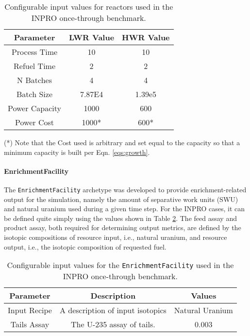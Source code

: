 \begin{table}[h]
\centering
\begin{threeparttable}
\begin{tabular}{ccc}
Parameter      & LWR Value & HWR Value               \\ \hline
Process Time   & 10         & 10                       \\
Refuel Time    & 2          & 2                        \\
N Batches      & 4          & 4                        \\
Batch Size     & 7.87E4     & 1.39e5                   \\
Power Capacity & 1000       & 600                      \\
Power Cost     & 1000*      & 600* \\ \hline
\end{tabular}
\begin{tablenotes}
  \small
  \item (*) Note that the Cost used is arbitrary and set equal to the
  capacity so that a minimum capacity is built per Eqn. \ref{eqs:growth}.
\end{tablenotes}
\end{threeparttable}
\caption{Configurable input values for reactors used in the INPRO once-through benchmark.}
\label{tbl:inprorxtr}
\end{table}

\paragraph{EnrichmentFacility}

The \texttt{EnrichmentFacility} archetype was developed to provide
enrichment-related output for the simulation, namely the amount of separative
work units (SWU) and natural uranium used during a given time step. For the
INPRO cases, it can be defined quite simply using the values shown in Table
\ref{tbl:inproenr}. The feed assay and product assay, both required for
determining output metrics, are defined by the isotopic compositions of
resource input, i.e., natural uranium, and resource output, i.e., the isotopic
composition of requested fuel.

\begin{table}[h]
\centering
\begin{tabular}{ccc}
Parameter    & Description                      & Values          \\ \hline
Input Recipe & A description of input isotopics & Natural Uranium \\
Tails Assay  & The U-235 assay of tails.        & 0.003          
\end{tabular}
\caption{Configurable input values for the \texttt{EnrichmentFacility} used in the
  INPRO once-through benchmark.}
\label{tbl:inproenr}
\end{table}

